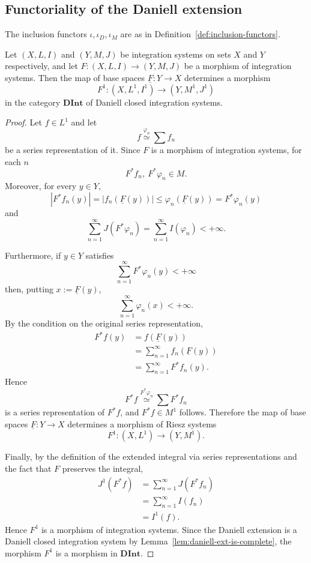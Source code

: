 \subsection{Functoriality of the Daniell extension}

The inclusion functors $\iota,\iota_{D},\iota_M$ are as in
Definition~\ref{def:inclusion-functors}.

\begin{lemma}\label{lem:daniell-ext-is-functor-1}
  Let $(X,L,I)$ and $(Y,M,J)$ be integration systems on sets $X$ and
  $Y$ respectively, and let $F:(X,L,I)\to(Y,M,J)$ be a morphism of integration
  systems.
  Then the map of base spaces $\underline{F}:Y\to X$ determines a morphism
  \[
    F^1:(X,L^1,I^1)\to(Y,M^1,J^1)
  \]
  in the category $\mathbf{DInt}$ of Daniell closed integration systems.
\end{lemma}
\begin{proof}
  Let $f\in L^1$ and let
  \[
    f\overset{\varphi_n}{\simeq}\sum f_n
  \]
  be a series representation of it.
  Since $F$ is a morphism of integration systems, for each $n$
  \[
    F^*f_n,\ F^*\varphi_n\in M .
  \]
  Moreover, for every $y\in Y$,
  \[
    |F^*f_n(y)|
    =|f_n(\underline{F}(y))|
    \le\varphi_n(\underline{F}(y))
    =F^*\varphi_n(y)
  \]
  and
  \[
    \sum_{n=1}^\infty J(F^*\varphi_n)
    =\sum_{n=1}^\infty I(\varphi_n)
    <+\infty.
  \]

  Furthermore, if $y\in Y$ satisfies
  \[
    \sum_{n=1}^\infty F^*\varphi_n(y)<+\infty
  \]
  then, putting $x:=\underline{F}(y)$,
  \[
    \sum_{n=1}^\infty\varphi_n(x)<+\infty .
  \]
  By the condition on the original series representation,
  \[
    \begin{aligned}
      F^*f(y)
      &=f(\underline{F}(y))\\
      &=\sum_{n=1}^\infty f_n(\underline{F}(y))\\
      &=\sum_{n=1}^\infty F^*f_n(y) .
    \end{aligned}
  \]
  Hence
  \[
    F^*f\overset{F^*\varphi_n}{\simeq}\sum F^*f_n
  \]
  is a series representation of $F^*f$, and $F^*f\in M^1$ follows. Therefore the
  map of base spaces $\underline{F}:Y\to X$ determines a morphism of Riesz
  systems
  \[
    F^1:(X,L^1)\to(Y,M^1) .
  \]

  Finally, by the definition of the extended integral via series
  representations and the fact that $F$ preserves the integral,
  \[
    \begin{aligned}
      J^1(F^*f)
      &=\sum_{n=1}^\infty J(F^*f_n)\\
      &=\sum_{n=1}^\infty I(f_n)\\
      &=I^1(f) .
    \end{aligned}
  \]
  Hence $F^1$ is a morphism of integration systems. Since the Daniell extension
  is a Daniell closed integration system by
  Lemma~\ref{lem:daniell-ext-is-complete}, the morphism $F^1$ is a morphism in
  $\mathbf{DInt}$.
\end{proof}

